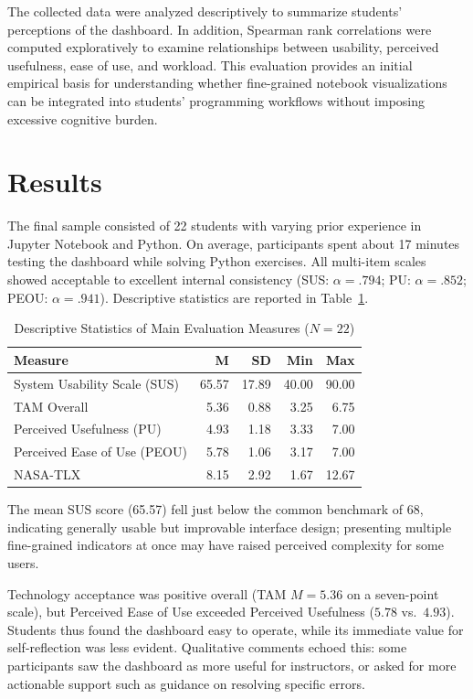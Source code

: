 \documentclass[acmsmall]{acmart}
\begin{document}
The collected data were analyzed descriptively to summarize students' perceptions of the dashboard. In addition, Spearman rank correlations were computed exploratively to examine relationships between usability, perceived usefulness, ease of use, and workload. This evaluation provides an initial empirical basis for understanding whether fine-grained notebook visualizations can be integrated into students' programming workflows without imposing excessive cognitive burden.

\section{Results}
The final sample consisted of 22 students with varying prior experience in Jupyter Notebook and Python. On average, participants spent about 17 minutes testing the dashboard while solving Python exercises. All multi-item scales showed acceptable to excellent internal consistency (SUS: $\alpha=.794$; PU: $\alpha=.852$; PEOU: $\alpha=.941$). Descriptive statistics are reported in Table~\ref{tab:descriptive_stats}.

\begin{table}
  \centering
  \caption{Descriptive Statistics of Main Evaluation Measures ($N=22$)}
  \label{tab:descriptive_stats}
  \small
  \begin{tabular}{l r r r r}
    \toprule
    \textbf{Measure} & \textbf{M} & \textbf{SD} & \textbf{Min} & \textbf{Max} \\
    \midrule
    System Usability Scale (SUS)      & 65.57 & 17.89 & 40.00 & 90.00 \\
    TAM Overall                       &  5.36 &  0.88 &  3.25 &  6.75 \\
    \quad Perceived Usefulness (PU)   &  4.93 &  1.18 &  3.33 &  7.00 \\
    \quad Perceived Ease of Use (PEOU)&  5.78 &  1.06 &  3.17 &  7.00 \\
    NASA-TLX                          &  8.15 &  2.92 &  1.67 & 12.67 \\
    \bottomrule
  \end{tabular}
\end{table}

The mean SUS score (65.57) fell just below the common benchmark of 68, indicating generally usable but improvable interface design; presenting multiple fine-grained indicators at once may have raised perceived complexity for some users.

Technology acceptance was positive overall (TAM $M=5.36$ on a seven-point scale), but Perceived Ease of Use exceeded Perceived Usefulness ($5.78$ vs.\ $4.93$). Students thus found the dashboard easy to operate, while its immediate value for self-reflection was less evident. Qualitative comments echoed this: some participants saw the dashboard as more useful for instructors, or asked for more actionable support such as guidance on resolving specific errors.
\end{document}
